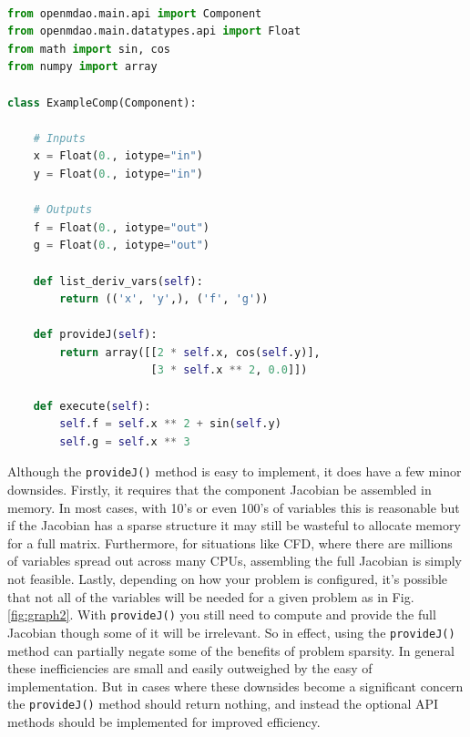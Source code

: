 \documentclass[]{aiaa-tc} %
\begin{document}
\begin{minipage}{\linewidth}
\begin{lstlisting}[label=code:component_with_jacobian,caption=Example OpenMDAO
component with user-specified Jacobian,
language=Python, basicstyle=\ttfamily\scriptsize,
           keywordstyle=\color{blue}\ttfamily,
           stringstyle=\color{red}\ttfamily, showstringspaces=false,
           commentstyle=\color{olive}\ttfamily]

from openmdao.main.api import Component
from openmdao.main.datatypes.api import Float
from math import sin, cos
from numpy import array

class ExampleComp(Component):

    # Inputs
    x = Float(0., iotype="in")
    y = Float(0., iotype="in")

    # Outputs
    f = Float(0., iotype="out")
    g = Float(0., iotype="out")

    def list_deriv_vars(self):
        return (('x', 'y',), ('f', 'g'))

    def provideJ(self):
        return array([[2 * self.x, cos(self.y)],
                      [3 * self.x ** 2, 0.0]])

    def execute(self):
        self.f = self.x ** 2 + sin(self.y)
        self.g = self.x ** 3

\end{lstlisting}
\end{minipage}

        Although the \texttt{provideJ()} method is easy to implement, it does have a few minor downsides. Firstly,
        it requires that the component Jacobian be assembled in memory. In most cases, with 10's or even 100's of variables
        this is reasonable but if the Jacobian has a sparse structure it may still be wasteful to allocate memory for a
        full matrix. Furthermore, for situations like CFD, where there are millions of variables spread out
        across many CPUs, assembling the full Jacobian is simply not feasible. Lastly, depending on how
        your problem is configured, it's possible that not all of the variables will be needed for a given problem as in Fig. \ref{fig:graph2}. 
        With \texttt{provideJ()} you still need to compute and provide the full Jacobian though some of it will be irrelevant.
        So in effect, using the \texttt{provideJ()} method can partially negate some of the benefits of problem sparsity. 
        In general these inefficiencies are small and easily outweighed by the easy of implementation. But in cases where 
        these downsides become a significant concern the \texttt{provideJ()} method should return nothing, and instead the
        optional API methods should be implemented for improved efficiency.
\end{document}
